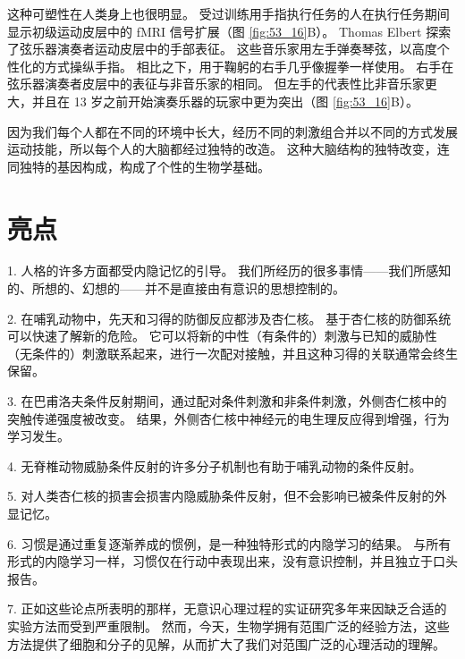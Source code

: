 这种可塑性在人类身上也很明显。
受过训练用手指执行任务的人在执行任务期间显示初级运动皮层中的 fMRI 信号扩展（图 \ref{fig:53_16}B）。
Thomas Elbert 探索了弦乐器演奏者运动皮层中的手部表征。
这些音乐家用左手弹奏琴弦，以高度个性化的方式操纵手指。
相比之下，用于鞠躬的右手几乎像握拳一样使用。
右手在弦乐器演奏者皮层中的表征与非音乐家的相同。
但左手的代表性比非音乐家更大，并且在 13 岁之前开始演奏乐器的玩家中更为突出（图 \ref{fig:53_16}B）。


因为我们每个人都在不同的环境中长大，经历不同的刺激组合并以不同的方式发展运动技能，所以每个人的大脑都经过独特的改造。
这种大脑结构的独特改变，连同独特的基因构成，构成了个性的生物学基础。



\section{亮点}

1. 人格的许多方面都受内隐记忆的引导。
我们所经历的很多事情——我们所感知的、所想的、幻想的——并不是直接由有意识的思想控制的。 


2. 在哺乳动物中，先天和习得的防御反应都涉及杏仁核。 基于杏仁核的防御系统可以快速了解新的危险。
它可以将新的中性（有条件的）刺激与已知的威胁性（无条件的）刺激联系起来，进行一次配对接触，并且这种习得的关联通常会终生保留。


3. 在巴甫洛夫条件反射期间，通过配对条件刺激和非条件刺激，外侧杏仁核中的突触传递强度被改变。
结果，外侧杏仁核中神经元的电生理反应得到增强，行为学习发生。


4. 无脊椎动物威胁条件反射的许多分子机制也有助于哺乳动物的条件反射。


5. 对人类杏仁核的损害会损害内隐威胁条件反射，但不会影响已被条件反射的外显记忆。


6. 习惯是通过重复逐渐养成的惯例，是一种独特形式的内隐学习的结果。
与所有形式的内隐学习一样，习惯仅在行动中表现出来，没有意识控制，并且独立于口头报告。


7. 正如这些论点所表明的那样，无意识心理过程的实证研究多年来因缺乏合适的实验方法而受到严重限制。
然而，今天，生物学拥有范围广泛的经验方法，这些方法提供了细胞和分子的见解，从而扩大了我们对范围广泛的心理活动的理解。


